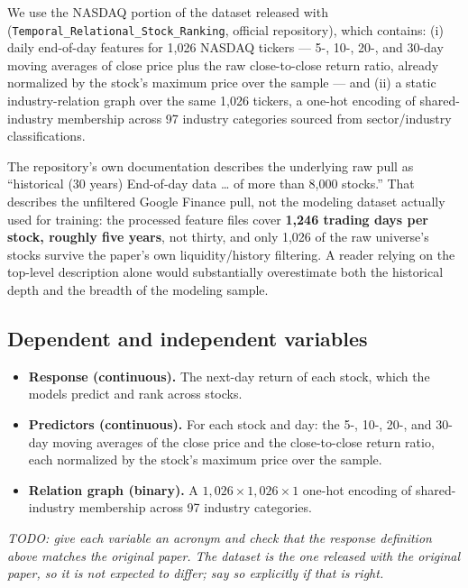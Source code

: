 \documentclass[12pt]{article}
\newcommand{\inst}[1]{\textit{#1}}
\begin{document}
We use the NASDAQ portion of the dataset released with \citet{feng2019temporal}
(\texttt{Temporal\_Relational\_Stock\_Ranking}, official repository), which contains: (i) daily
end-of-day features for 1{,}026 NASDAQ tickers --- 5-, 10-, 20-, and 30-day moving averages of
close price plus the raw close-to-close return ratio, already normalized by the stock's maximum
price over the sample --- and (ii) a static industry-relation graph over the same 1{,}026 tickers,
a one-hot encoding of shared-industry membership across 97 industry categories sourced from
sector/industry classifications.

The repository's own documentation describes the underlying raw pull as ``historical (30 years)
End-of-day data \ldots{} of more than 8,000 stocks.'' That describes the unfiltered Google Finance
pull, not the modeling dataset actually used for training: the processed feature files cover
\textbf{1{,}246 trading days per stock, roughly five years}, not thirty, and only 1{,}026 of the
raw universe's stocks survive the paper's own liquidity/history filtering. A reader relying on the
top-level description alone would substantially overestimate both the historical depth and the
breadth of the modeling sample.

\subsection{Dependent and independent variables}

\begin{itemize}
  \item \textbf{Response (continuous).} The next-day return of each stock, which the models
  predict and rank across stocks.
  \item \textbf{Predictors (continuous).} For each stock and day: the 5-, 10-, 20-, and 30-day
  moving averages of the close price and the close-to-close return ratio, each normalized by the
  stock's maximum price over the sample.
  \item \textbf{Relation graph (binary).} A $1{,}026\times1{,}026\times1$ one-hot encoding of
  shared-industry membership across 97 industry categories.
\end{itemize}

\inst{TODO: give each variable an acronym and check that the response definition above matches
the original paper. The dataset is the one released with the original paper, so it is not
expected to differ; say so explicitly if that is right.}
\end{document}
